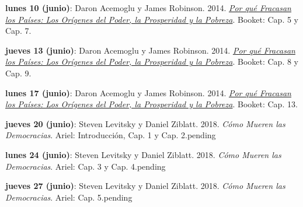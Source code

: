 \documentclass[letterpaper]{article}
\renewenvironment{itemize}{
  \begin{list}{}{
    \setlength{\leftmargin}{1.5em}
  }
}{
  \end{list}
}
\begin{document}
\begin{enumerate}
\begin{itemize}
    \vspace{0.2cm}

		\item {\bf lunes 10 (junio)}: Daron Acemoglu y James Robinson. 2014. \href{https://github.com/hbahamonde/Intro_Ciencias_Sociales/raw/master/Readings/Why_Nations_Fail.pdf}{\emph{Por qu\'e Fracasan los Pa\'ises: Los Or\'igenes del Poder, la Prosperidad y la Pobreza}}. Booket: Cap. 5 y Cap. 7.

    \vspace{0.2cm}

		\item {\bf jueves 13 (junio)}: Daron Acemoglu y James Robinson. 2014. \href{https://github.com/hbahamonde/Intro_Ciencias_Sociales/raw/master/Readings/Why_Nations_Fail.pdf}{\emph{Por qu\'e Fracasan los Pa\'ises: Los Or\'igenes del Poder, la Prosperidad y la Pobreza}}. Booket: Cap. 8 y Cap. 9.

    \vspace{0.2cm}


		\item {\bf lunes 17 (junio)}: Daron Acemoglu y James Robinson. 2014. \href{https://github.com/hbahamonde/Intro_Ciencias_Sociales/raw/master/Readings/Why_Nations_Fail.pdf}{\emph{Por qu\'e Fracasan los Pa\'ises: Los Or\'igenes del Poder, la Prosperidad y la Pobreza}}. Booket: Cap. 13.

    \vspace{0.2cm}

		\item {\bf jueves 20 (junio)}: Steven Levitsky y Daniel Ziblatt. 2018. \emph{C\'omo Mueren las Democracias}. Ariel: Introducci\'on, Cap. 1 y Cap. 2.{\color{red}pending}

    \vspace{0.2cm}


		\item {\bf lunes 24 (junio)}: Steven Levitsky y Daniel Ziblatt. 2018. \emph{C\'omo Mueren las Democracias}. Ariel: Cap. 3 y Cap. 4.{\color{red}pending}

    \vspace{0.2cm}

    \item {\bf jueves 27 (junio)}: Steven Levitsky y Daniel Ziblatt. 2018. \emph{C\'omo Mueren las Democracias}. Ariel: Cap. 5.{\color{red}pending}


\end{itemize}
\end{enumerate}
\end{document}
